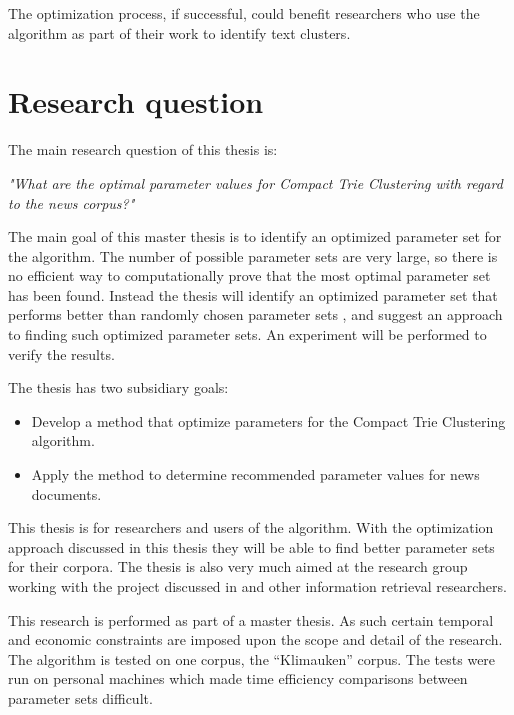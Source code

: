 The optimization process, if successful, could benefit researchers who use the algorithm as part of their work to identify text clusters.



\section{Research question}
The main research question of this thesis is:

\emph{"What are the optimal parameter values for Compact Trie Clustering with regard to the news corpus?"}

The main goal of this master thesis is to identify an optimized parameter set for the \CTC algorithm. The number of possible parameter sets are very large, so there is no efficient way to computationally prove that the most optimal parameter set has been found. Instead the thesis will identify an optimized parameter set that performs better than randomly chosen parameter sets , and suggest an approach to finding such optimized parameter sets. An experiment will be performed to verify the results.

The thesis has two subsidiary goals:
\begin{itemize}
	\item Develop a method that optimize parameters for the Compact Trie Clustering algorithm.
	\item Apply the method to determine recommended parameter values for news documents.
\end{itemize}

This thesis is for researchers and users of the \STC algorithm. With the optimization approach discussed in this thesis they will be able to find better parameter sets for their corpora. The thesis is also very much aimed at the research group working with the project discussed in  and other information retrieval researchers.

This research is performed as part of a master thesis. As such certain temporal and economic constraints are imposed upon the scope and detail of the research. The algorithm is tested on one corpus, the ``Klimauken'' corpus. The tests were run on personal machines which made time efficiency comparisons between parameter sets difficult.